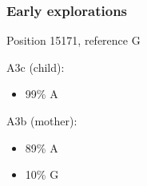\documentclass[slidestop,14pt]{beamer}
\begin{document}
{
  \frame{}
}

\begin{frame}
  \frametitle{Early explorations}

  \vspace{\baselineskip}

  Position 15171, reference G

  \vspace{\baselineskip}

  \pause

  A3c (child):
  \begin{itemize}
    \item 99\% {\color{Red} A}
  \end{itemize}

  \vspace{\baselineskip}

  \pause

  A3b (mother):
  \begin{itemize}
    \item 89\% {\color{Red} A}
    \item 10\% {\color{Green} G}
  \end{itemize}
\end{frame}
\end{document}
